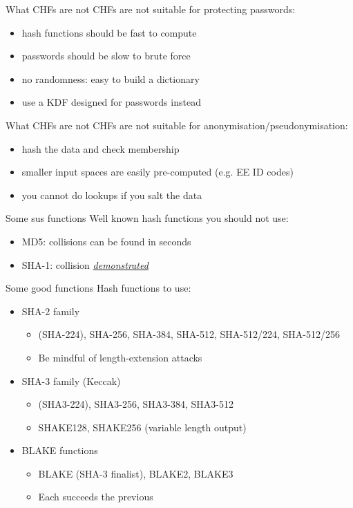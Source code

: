 \begin{frame}{What CHFs are not}
  CHFs are not suitable for protecting passwords:
  \begin{itemize}[<+(1)->]
    \item hash functions should be fast to compute
    \item passwords should be slow to brute force
    \item no randomness: easy to build a dictionary
    \item use a KDF designed for passwords instead
  \end{itemize}
\end{frame}

\begin{frame}{What CHFs are not}
  CHFs are not suitable for anonymisation/pseudonymisation:
  \begin{itemize}[<+(1)->]
    \item hash the data and check membership
    \item smaller input spaces are easily pre-computed (e.g. EE ID codes)
    \item you cannot do lookups if you salt the data
  \end{itemize}
\end{frame}

\begin{frame}{Some sus functions}
  Well known hash functions you should not use:
  \begin{itemize}[<+(1)->]
    \item MD5: collisions can be found in seconds
    \item SHA-1: collision \href{https://shattered.io}{\textit{demonstrated}}
  \end{itemize}
\end{frame}

\begin{frame}{Some good functions}
  Hash functions to use:
  \begin{itemize}[<+(1)->]
    \item SHA-2 family
    \begin{itemize}
      \item (SHA-224), SHA-256, SHA-384, SHA-512, SHA-512/224, SHA-512/256
      \item Be mindful of length-extension attacks
    \end{itemize}
    \item SHA-3 family (Keccak)
    \begin{itemize}
      \item (SHA3-224), SHA3-256, SHA3-384, SHA3-512
      \item SHAKE128, SHAKE256 (variable length output)
    \end{itemize}
    \item BLAKE functions
    \begin{itemize}
      \item BLAKE (SHA-3 finalist), BLAKE2, BLAKE3
      \item Each succeeds the previous
    \end{itemize}
  \end{itemize}
\end{frame}

